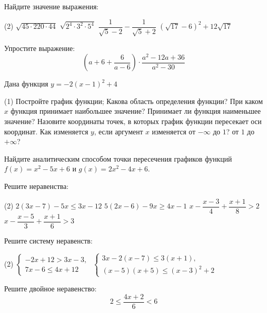 \begin{exam}
	\begin{listofex}
		\item Найдите значение выражения:
		\begin{tasks}(2)
			\task \( \sqrt{45\cdot220\cdot44} \)
			\task \( \sqrt{2^4\cdot3^2\cdot5^4} \)
			\task \( \dfrac{1}{\sqrt{5}-2}-\dfrac{1}{\sqrt{5}+2} \)
			\task \( (\sqrt{17}-6)^2+12\sqrt{17} \)
		\end{tasks}
		\item Упростите выражение:
		 \[\left( a+6+\dfrac{6}{a-6} \right)\cdot\dfrac{a^2-12a+36}{a^2-30} \]
		\item Дана функция \( y=-2(x-1)^2+4 \)
		\begin{tasks}(1)
			\task Постройте график функции;
			\task Какова область определения функции?
			\task При каком \( x \) функция принимает наибольшее значение? Принимает ли функция наименьшее значение?
			\task Назовите координаты точек, в которых график функции пересекает оси координат.
			\task Как изменяется \( y \), если аргумент \( x \) изменяется от \( -\infty  \) до \( 1 \)? от \( 1 \) до \( +\infty \)?
		\end{tasks}
		\item Найдите аналитическим способом точки пересечения графиков функций \(f(x)=x^2-5x+6\)	и \( g(x)=2x^2-4x+6 \).
		\item Решите неравенства:
		\begin{tasks}(2)
			\task \( 2(3x-7)-5x\leq3x-12 \)
			\task \( 5(2x-6)-9x\geq4x-1 \)
			\task \( x-\dfrac{x-3}{4}+\dfrac{x+1}{8}>2 \)
			\task \( x-\dfrac{x-5}{3}+\dfrac{x+1}{6}>3 \)
		\end{tasks}
		\item Решите систему неравенств:
		\begin{tasks}(2)
			\task \( \left\{
			\begin{array}{l}
				-2x+12>3x-3,\\
				7x-6\leq4x+12
			\end{array}
			\right. \)
			\task \( \left\{
			\begin{array}{l}
				3x-2(x-7)\leq3(x+1),\\
				(x-5)(x+5)\leq(x-3)^2+2
			\end{array}
			\right. \)
		\end{tasks}
		\item Решите двойное неравенство:
			\[ 2\leq\dfrac{4x+2}{6}<6\] 
	\end{listofex}
\end{exam}

